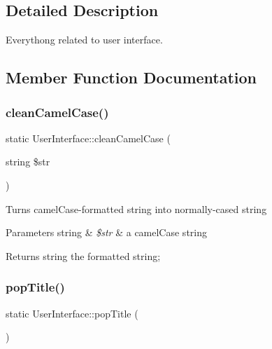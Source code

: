 \subsection{Detailed Description}
Everythong related to user interface. 

\subsection{Member Function Documentation}
\mbox{\label{classUserInterface_ad13abbe2f3f716e40b2005a8965e6c81}} 
\subsubsection{\texorpdfstring{clean\+Camel\+Case()}{cleanCamelCase()}}
{\footnotesize\ttfamily static User\+Interface\+::clean\+Camel\+Case (\begin{DoxyParamCaption}\item[{string}]{\$str }\end{DoxyParamCaption})\hspace{0.3cm}{\ttfamily [static]}}

Turns camel\+Case-\/formatted string into \textquotesingle{}normally\textquotesingle{}-\/cased string 
\begin{DoxyParams}[1]{Parameters}
string & {\em \$str} & a camel\+Case string \\
\hline
\end{DoxyParams}
\begin{DoxyReturn}{Returns}
string the formatted string; 
\end{DoxyReturn}
\mbox{\label{classUserInterface_adc9951b8ed9d81b31371198ce14d491f}} 
\subsubsection{\texorpdfstring{pop\+Title()}{popTitle()}}
{\footnotesize\ttfamily static User\+Interface\+::pop\+Title (\begin{DoxyParamCaption}{ }\end{DoxyParamCaption})\hspace{0.3cm}{\ttfamily [static]}}

